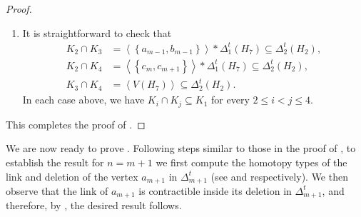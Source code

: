 \documentclass[11pt,reqno,a4paper]{amsart}
\theoremstyle{definition}
\theoremstyle{theorem}
\newcommand{\lno}{\left(}
\newcommand{\rno}{\right)}
\newcommand{\lcu}{\left\{}
\newcommand{\rcu}{\right\}}
\theoremstyle{remark}
\begin{document}
\begin{proof}
\begin{enumerate}
\begin{enumerate}[label = \Alph*.]
    It is easy to verify that $x = y$ works if and only if $x \in V\lno H_7 \rno$, in which case $\sigma \in K_2$. If $x = y$ does not work, then 
    \[
        \lcu x, y \rcu \subseteq \lcu a_{m-1}, b_{m-1}, c_m, c_{m+1} \rcu,
    \]
    with $x$ and $y$ adjacent because $\sigma \notin K_1$. Hence the pair $\lno x, y \rno$ must be one of the following:
    \begin{enumerate}[label = \roman*.]
        \item $\lno x, y \rno = \lno c_m, c_{m+1} \rno$, in which case $\sigma \in K_3$;
        \item $\lno x, y \rno = \lno a_{m-1}, b_{m-1} \rno$, in which case $\sigma \in K_4$.
    \end{enumerate}
    \end{enumerate}

Thus, if $\sigma \in \Delta_2$, then $\sigma \in \bigcup\limits_{i=1}^4 K_i$. This proves (1).

\item It is straightforward to check that
\begin{align*}
    K_2 \cap K_3 &= \left\langle \lcu a_{m-1}, b_{m-1} \rcu \right\rangle * \Delta_1^t \lno H_7 \rno \subseteq \Delta_2^t \lno H_2 \rno,\\
    K_2 \cap K_4 &= \left\langle \lcu c_{m}, c_{m+1} \rcu \right\rangle * \Delta_1^t \lno H_7 \rno \subseteq \Delta_2^t \lno H_2 \rno,\\
    K_3 \cap K_4 &= \left\langle V\lno H_7 \rno \right\rangle \subseteq \Delta_2^t \lno H_2 \rno.
\end{align*}
In each case above, we have $K_i \cap K_j \subseteq K_1$ for every $2 \leq i < j \leq 4$.
\end{enumerate}

This completes the proof of .
\end{proof}

We are now ready to prove . Following steps similar to those in the proof of , to establish the result for $n = m+1$ we first compute the homotopy types of the link and deletion of the vertex $a_{m+1}$ in $\Delta_{m+1}^t$ (see  and  respectively). We then observe that the link of $a_{m+1}$ is contractible inside its deletion in $\Delta_{m+1}^t$, and therefore, by , the desired result follows.
    
\end{document}
